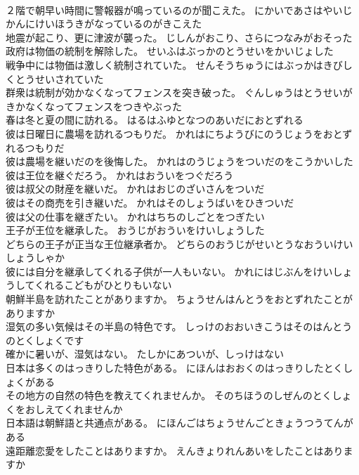 \documentclass[8pt]{extreport}
\begin{document}
\begin{CJK}{UTF8}{min}
\\	２階で朝早い時間に警報器が鳴っているのが聞こえた。	にかいであさはやいじかんにけいほうきがなっているのがきこえた 
\\	地震が起こり、更に津波が襲った。	じしんがおこり、さらにつなみがおそった 
\\	政府は物価の統制を解除した。	せいふはぶっかのとうせいをかいじょした 
\\	戦争中には物価は激しく統制されていた。	せんそうちゅうにはぶっかはきびしくとうせいされていた 
\\	群衆は統制が効かなくなってフェンスを突き破った。	ぐんしゅうはとうせいがきかなくなってフェンスをつきやぶった 
\\	春は冬と夏の間に訪れる。	はるはふゆとなつのあいだにおとずれる 
\\	彼は日曜日に農場を訪れるつもりだ。	かれはにちようびにのうじょうをおとずれるつもりだ 
\\	彼は農場を継いだのを後悔した。	かれはのうじょうをついだのをこうかいした 
\\	彼は王位を継ぐだろう。	かれはおういをつぐだろう 
\\	彼は叔父の財産を継いだ。	かれはおじのざいさんをついだ 
\\	彼はその商売を引き継いだ。	かれはそのしょうばいをひきついだ 
\\	彼は父の仕事を継ぎたい。	かれはちちのしごとをつぎたい 
\\	王子が王位を継承した。	おうじがおういをけいしょうした 
\\	どちらの王子が正当な王位継承者か。	どちらのおうじがせいとうなおういけいしょうしゃか 
\\	彼には自分を継承してくれる子供が一人もいない。	かれにはじぶんをけいしょうしてくれるこどもがひとりもいない 
\\	朝鮮半島を訪れたことがありますか。	ちょうせんはんとうをおとずれたことがありますか 
\\	湿気の多い気候はその半島の特色です。	しっけのおおいきこうはそのはんとうのとくしょくです 
\\	確かに暑いが、湿気はない。	たしかにあついが、しっけはない 
\\	日本は多くのはっきりした特色がある。	にほんはおおくのはっきりしたとくしょくがある 
\\	その地方の自然の特色を教えてくれませんか。	そのちほうのしぜんのとくしょくをおしえてくれませんか 
\\	日本語は朝鮮語と共通点がある。	にほんごはちょうせんごときょうつうてんがある 
\\	遠距離恋愛をしたことはありますか。	えんきょりれんあいをしたことはありますか 

\end{CJK}
\end{document}
